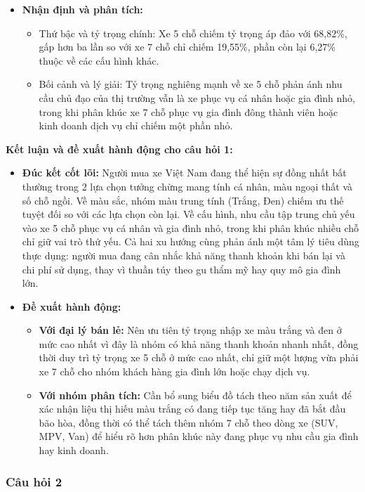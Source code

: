 \begin{itemize}
    \item \textbf{Nhận định và phân tích:}
    \begin{itemize}
        \item Thứ bậc và tỷ trọng chính: Xe 5 chỗ chiếm tỷ trọng áp đảo với 68,82\%, gấp hơn ba lần so với xe 7 chỗ chỉ chiếm 19,55\%, phần còn lại 6,27\% thuộc về các cấu hình khác.
        \item Bối cảnh và lý giải: Tỷ trọng nghiêng mạnh về xe 5 chỗ phản ánh nhu cầu chủ đạo của thị trường vẫn là xe phục vụ cá nhân hoặc gia đình nhỏ, trong khi phân khúc xe 7 chỗ phục vụ gia đình đông thành viên hoặc kinh doanh dịch vụ chỉ chiếm một phần nhỏ.
    \end{itemize}
\end{itemize}

\noindent\textbf{Kết luận và đề xuất hành động cho câu hỏi 1:} 
\begin{itemize}
    \item \textbf{Đúc kết cốt lõi:} Người mua xe Việt Nam đang thể hiện sự đồng nhất bất thường trong 2 lựa chọn tưởng chừng mang tính cá nhân, màu ngoại thất và số chỗ ngồi. Về màu sắc, nhóm màu trung tính (Trắng, Đen) chiếm ưu thế tuyệt đối so với các lựa chọn còn lại. Về cấu hình, nhu cầu tập trung chủ yếu vào xe 5 chỗ phục vụ cá nhân và gia đình nhỏ, trong khi phân khúc nhiều chỗ chỉ giữ vai trò thứ yếu. Cả hai xu hướng cùng phản ánh một tâm lý tiêu dùng thực dụng: người mua đang cân nhắc khả năng thanh khoản khi bán lại và chi phí sử dụng, thay vì thuần túy theo gu thẩm mỹ hay quy mô gia đình lớn.
    \item \textbf{Đề xuất hành động:} 
    \begin{itemize}
        \item \textbf{Với đại lý bán lẻ:} Nên ưu tiên tỷ trọng nhập xe màu trắng và đen ở mức cao nhất vì đây là nhóm có khả năng thanh khoản nhanh nhất, đồng thời duy trì tỷ trọng xe 5 chỗ ở mức cao nhất, chỉ giữ một lượng vừa phải xe 7 chỗ cho nhóm khách hàng gia đình lớn hoặc chạy dịch vụ.
        \item \textbf{Với nhóm phân tích:} Cần bổ sung biểu đồ tách theo năm sản xuất để xác nhận liệu thị hiếu màu trắng có đang tiếp tục tăng hay đã bắt đầu bão hòa, đồng thời có thể tách thêm nhóm 7 chỗ theo dòng xe (SUV, MPV, Van) để hiểu rõ hơn phân khúc này đang phục vụ nhu cầu gia đình hay kinh doanh.
    \end{itemize}
\end{itemize}


\subsubsection{Câu hỏi 2}
\label{subsubsec:tab4_q2}

